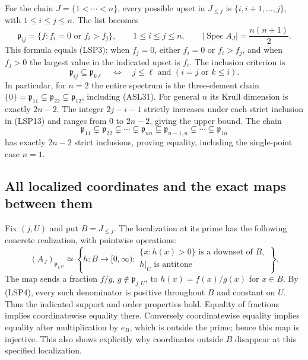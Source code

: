 For the chain $J=\{1<\cdots<n\}$, every possible upset in
$J_{\le j}$ is $\{i,i+1,\ldots,j\}$, with $1\le i\le j\le n$.
The list becomes
\begin{equation}\tag{LSP12}
 \mathfrak p_{ij}=\{f:f_i=0\text{ or }f_i>f_j\},
 \qquad 1\le i\le j\le n,
 \qquad |\operatorname{Spec}A_J|=\frac{n(n+1)}2.
\end{equation}
This formula equals (LSP3): when $f_j=0$, either $f_i=0$ or
$f_i>f_j$, and when $f_j>0$ the largest value in the indicated
upset is $f_i$. The inclusion criterion is
\begin{equation}\tag{LSP13}
 \mathfrak p_{ij}\subseteq\mathfrak p_{k\ell}
 \quad\Longleftrightarrow\quad
 j\le\ell\text{ and }(i=j\text{ or }k\le i).
\end{equation}
In particular, for $n=2$ the entire spectrum is the three-element
chain $\{0\}=\mathfrak p_{11}\subsetneq\mathfrak p_{22}
\subsetneq\mathfrak p_{12}$, including (ASL31).
For general $n$ its Krull dimension is exactly $2n-2$. The integer
$2j-i-1$ strictly increases under each strict inclusion in (LSP13)
and ranges from $0$ to $2n-2$, giving the upper bound. The chain
\begin{equation}\tag{LSP14}
 \mathfrak p_{11}\subsetneq\mathfrak p_{22}
 \subsetneq\cdots\subsetneq\mathfrak p_{nn}
 \subsetneq\mathfrak p_{n-1,n}\subsetneq\cdots
 \subsetneq\mathfrak p_{1n}
\end{equation}
has exactly $2n-2$ strict inclusions, proving equality, including
the single-point case $n=1$.

\subsection{All localized coordinates and the exact maps between them}

Fix $(j,U)$ and put $B=J_{\le j}$. The localization at its prime
has the following concrete realization, with pointwise operations:
\begin{equation}\tag{LSP15}
 (A_J)_{\mathfrak p_{j,U}}\simeq
 \left\{h:B\to[0,\infty):
 \begin{array}{l}
 \{x:h(x)>0\}\text{ is a downset of }B,\\
 h|_U\text{ is antitone}
 \end{array}\right\}.
\end{equation}
The map sends a fraction $f/g$, $g\notin\mathfrak p_{j,U}$,
to $h(x)=f(x)/g(x)$ for $x\in B$. By (LSP4), every such denominator
is positive throughout $B$ and constant on $U$. Thus the indicated
support and order properties hold. Equality of fractions implies
coordinatewise equality there. Conversely coordinatewise equality
implies equality after multiplication by $e_B$, which is outside
the prime; hence this map is injective. This also shows explicitly
why coordinates outside $B$ disappear at this specified localization.

